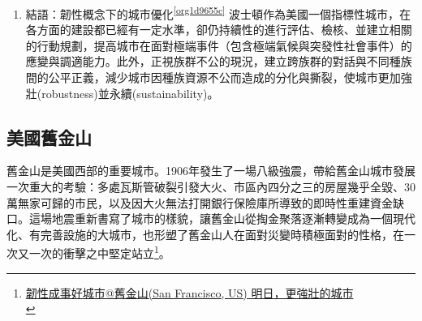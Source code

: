 \documentclass[a4paper,12pt]{article}
\begin{document}
\begin{enumerate}
\item 結語：韌性概念下的城市優化\textsuperscript{\ref{org1d9655c}}
\label{sec:orgce00167}
波士頓作為美國一個指標性城市，在各方面的建設都已經有一定水準，卻仍持續性的進行評估、檢核、並建立相關的行動規劃，提高城市在面對極端事件（包含極端氣候與突發性社會事件）的應變與調適能力。此外，正視族群不公的現況，建立跨族群的對話與不同種族間的公平正義，減少城市因種族資源不公而造成的分化與撕裂，使城市更加強壯(robustness)並永續(sustainability)。\\
\end{enumerate}

\subsection{美國舊金山}
\label{sec:orgdb10ea1}
舊金山是美國西部的重要城市。1906年發生了一場八級強震，帶給舊金山城市發展一次重大的考驗：多處瓦斯管破裂引發大火、市區內四分之三的房屋幾乎全毀、30萬無家可歸的市民，以及因大火無法打開銀行保險庫所導致的即時性重建資金缺口。這場地震重新書寫了城市的樣貌，讓舊金山從掏金聚落逐漸轉變成為一個現代化、有完善設施的大城市，也形塑了舊金山人在面對災變時積極面對的性格，在一次又一次的衝擊之中堅定站立\footnote{\href{https://eyesonplace.net/2018/12/31/10103/}{韌性成事好城市@舊金山(San Francisco, US) 明日，更強壯的城市}\\\label{org842fc20}}。\\
\end{document}
